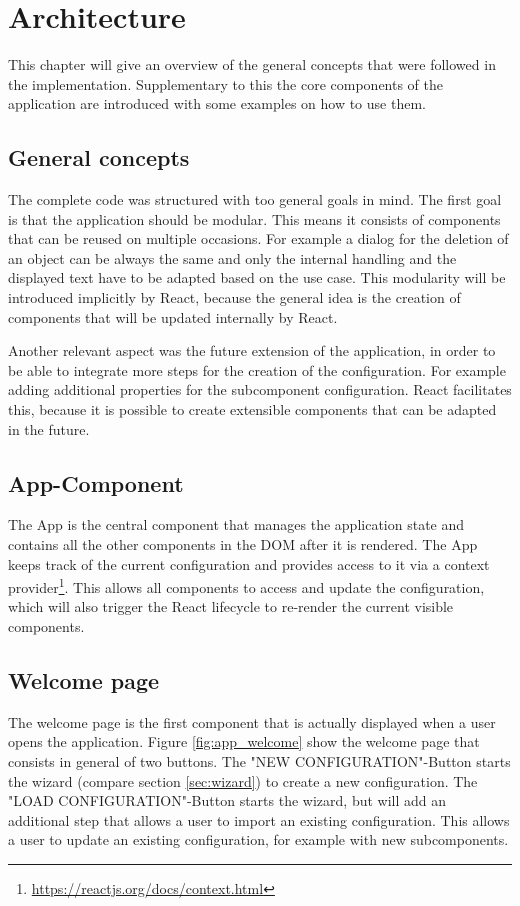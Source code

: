 \chapter{Architecture}
\label{sec:architecture}
This chapter will give an overview of the general concepts that were followed in the implementation. Supplementary to this the core components of the application are introduced with some examples on how to use them.

\section{General concepts}
The complete code was structured with too general goals in mind. The first goal is that the application should be modular. This means it consists of components that can be reused on multiple occasions. For example a dialog for the deletion of an object can be always the same and only the internal handling and the displayed text have to be adapted based on the use case. This modularity will be introduced implicitly by React, because the general idea is the creation of components that will be updated internally by React.

Another relevant aspect was the future extension of the application, in order to be able to integrate more steps for the creation of the configuration. For example adding additional properties for the subcomponent configuration. React facilitates this, because it is possible to create extensible components that can be adapted in the future.

\section{App-Component}
The App is the central component that manages the application state and contains all the other components in the DOM after it is rendered. The App keeps track of the current configuration and provides access to it via a context provider\footnote{\url{https://reactjs.org/docs/context.html}}. This allows all components to access and update the configuration, which will also trigger the React lifecycle to re-render the current visible components.

\section{Welcome page}
The welcome page is the first component that is actually displayed when a user opens the application. Figure \ref{fig:app_welcome} show the welcome page that consists in general of two buttons. The "NEW CONFIGURATION"-Button starts the wizard (compare section \ref{sec:wizard}) to create a new configuration. The "LOAD CONFIGURATION"-Button starts the wizard, but will add an additional step that allows a user to import an existing configuration. This allows a user to update an existing configuration, for example with new subcomponents.

